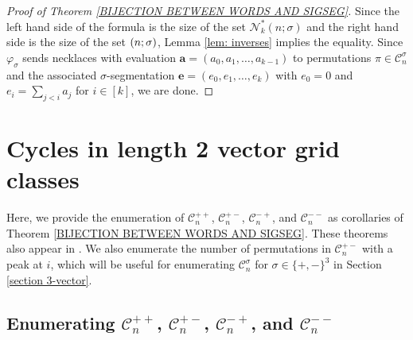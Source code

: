 \documentclass[12pt]{article}
\let\SS\relax
\DeclareMathOperator{\SS}{Seg}
\renewcommand{\S}{\mathcal{S}}
\newcommand{\C}{\mathcal{C}}
\newcommand{\N}{\mathcal{N}}
\newcommand{\e}{\mathbf{e}}
\theoremstyle{plain}
\theoremstyle{definition}
\begin{document}
\begin{proof}[Proof of Theorem \ref{BIJECTION BETWEEN WORDS AND SIGSEG}]
Since the left hand side of the formula is the size of the set $\N^*_k(n;\sigma)$ and the right hand side is the size of the set $\SS(n;\sigma)$, Lemma \ref{lem: inverses} implies the equality. Since $\varphi_\sigma$ sends necklaces with evaluation $\mathbf{a}=(a_0, a_1,\ldots, a_{k-1})$ to permutations $\pi \in\C_n^\sigma$ and the associated $\sigma$-segmentation $\e=(e_0, e_1, \ldots, e_k)$ with $e_0=0$ and $e_i = \displaystyle\sum_{j<i} a_j$ for $i\in[k]$, we are done.
\end{proof}


\section{Cycles in length 2 vector grid classes}\label{section 2-vector}

Here, we provide the enumeration of $\C_n^{++}$, $\C_n^{+-}$, $\C_n^{-+}$, and $\C_n^{--}$ as corollaries of Theorem \ref{BIJECTION BETWEEN WORDS AND SIGSEG}. These theorems also appear in \cite{gessel, ARCHERELIZALDE2014}. 
We also enumerate the number of permutations in $\C_n^{+-}$ with a peak at $i$, which will be useful for enumerating $\C_n^\sigma$ for $\sigma\in\{+,-\}^3$ in Section \ref{section 3-vector}.

\subsection{Enumerating $\C_n^{++}$, $\C_n^{+-}$, $\C_n^{-+}$, and $\C_n^{--}$}
\end{document}
